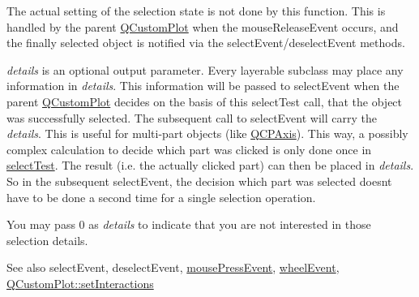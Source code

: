 The actual setting of the selection state is not done by this function. This is handled by the parent \hyperlink{class_q_custom_plot}{Q\+Custom\+Plot} when the mouse\+Release\+Event occurs, and the finally selected object is notified via the select\+Event/deselect\+Event methods.

{\itshape details} is an optional output parameter. Every layerable subclass may place any information in {\itshape details}. This information will be passed to select\+Event when the parent \hyperlink{class_q_custom_plot}{Q\+Custom\+Plot} decides on the basis of this select\+Test call, that the object was successfully selected. The subsequent call to select\+Event will carry the {\itshape details}. This is useful for multi-\/part objects (like \hyperlink{class_q_c_p_axis}{Q\+C\+P\+Axis}). This way, a possibly complex calculation to decide which part was clicked is only done once in \hyperlink{class_q_c_p_layerable_a04db8351fefd44cfdb77958e75c6288e}{select\+Test}. The result (i.\+e. the actually clicked part) can then be placed in {\itshape details}. So in the subsequent select\+Event, the decision which part was selected doesn\textquotesingle{}t have to be done a second time for a single selection operation.

You may pass 0 as {\itshape details} to indicate that you are not interested in those selection details.

\begin{DoxySeeAlso}{See also}
select\+Event, deselect\+Event, \hyperlink{class_q_c_p_layerable_af6567604818db90f4fd52822f8bc8376}{mouse\+Press\+Event}, \hyperlink{class_q_c_p_layerable_a47dfd7b8fd99c08ca54e09c362b6f022}{wheel\+Event}, \hyperlink{class_q_custom_plot_a5ee1e2f6ae27419deca53e75907c27e5}{Q\+Custom\+Plot\+::set\+Interactions} 
\end{DoxySeeAlso}


